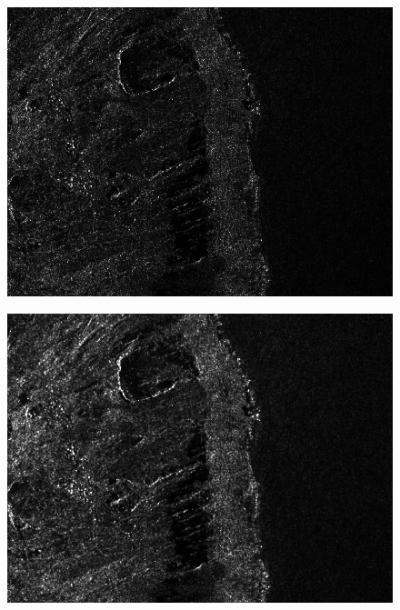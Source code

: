 \begin{center}
  \begin{figure}[h!]
    \includegraphics[width=\textwidth]{../Art/S1-VV-extract-int.png}
    \label{fig:S1VVextractint}
   \end{figure}
   
   \begin{figure}[h!]
    \includegraphics[width=\textwidth]{../Art/S1-VV-despeckled-extract.png}
    \label{fig:S1VVdespeckledextract}
   \end{figure}
\end{center}


